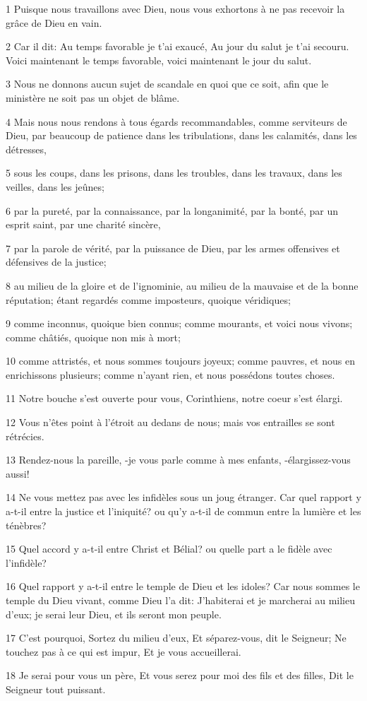 \par 1 Puisque nous travaillons avec Dieu, nous vous exhortons à ne pas recevoir la grâce de Dieu en vain.
\par 2 Car il dit: Au temps favorable je t'ai exaucé, Au jour du salut je t'ai secouru. Voici maintenant le temps favorable, voici maintenant le jour du salut.
\par 3 Nous ne donnons aucun sujet de scandale en quoi que ce soit, afin que le ministère ne soit pas un objet de blâme.
\par 4 Mais nous nous rendons à tous égards recommandables, comme serviteurs de Dieu, par beaucoup de patience dans les tribulations, dans les calamités, dans les détresses,
\par 5 sous les coups, dans les prisons, dans les troubles, dans les travaux, dans les veilles, dans les jeûnes;
\par 6 par la pureté, par la connaissance, par la longanimité, par la bonté, par un esprit saint, par une charité sincère,
\par 7 par la parole de vérité, par la puissance de Dieu, par les armes offensives et défensives de la justice;
\par 8 au milieu de la gloire et de l'ignominie, au milieu de la mauvaise et de la bonne réputation; étant regardés comme imposteurs, quoique véridiques;
\par 9 comme inconnus, quoique bien connus; comme mourants, et voici nous vivons; comme châtiés, quoique non mis à mort;
\par 10 comme attristés, et nous sommes toujours joyeux; comme pauvres, et nous en enrichissons plusieurs; comme n'ayant rien, et nous possédons toutes choses.
\par 11 Notre bouche s'est ouverte pour vous, Corinthiens, notre coeur s'est élargi.
\par 12 Vous n'êtes point à l'étroit au dedans de nous; mais vos entrailles se sont rétrécies.
\par 13 Rendez-nous la pareille, -je vous parle comme à mes enfants, -élargissez-vous aussi!
\par 14 Ne vous mettez pas avec les infidèles sous un joug étranger. Car quel rapport y a-t-il entre la justice et l'iniquité? ou qu'y a-t-il de commun entre la lumière et les ténèbres?
\par 15 Quel accord y a-t-il entre Christ et Bélial? ou quelle part a le fidèle avec l'infidèle?
\par 16 Quel rapport y a-t-il entre le temple de Dieu et les idoles? Car nous sommes le temple du Dieu vivant, comme Dieu l'a dit: J'habiterai et je marcherai au milieu d'eux; je serai leur Dieu, et ils seront mon peuple.
\par 17 C'est pourquoi, Sortez du milieu d'eux, Et séparez-vous, dit le Seigneur; Ne touchez pas à ce qui est impur, Et je vous accueillerai.
\par 18 Je serai pour vous un père, Et vous serez pour moi des fils et des filles, Dit le Seigneur tout puissant.

